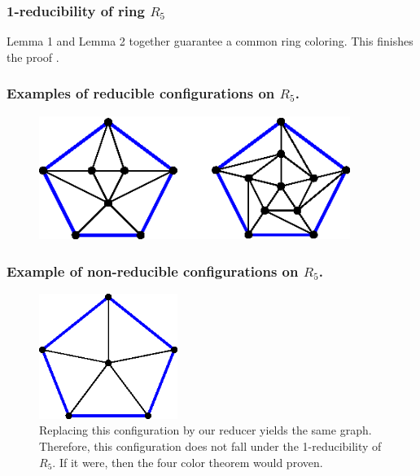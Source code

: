 \begin{frame}
    \frametitle{1-reducibility of ring $R_5$}

    Lemma 1 and Lemma 2 together guarantee a common ring coloring. This finishes the proof \qedsymbol.
\end{frame}

\begin{frame}
    \frametitle{Examples of reducible configurations on $R_5$.}
    \begin{figure}
        \centering
        \includegraphics[width=0.9\textwidth]{images/example5.eps}
    \end{figure}
\end{frame}

\begin{frame}
    \frametitle{Example of non-reducible configurations on $R_5$.}
    \begin{figure}
        \centering
        \includegraphics[width=0.4\textwidth]{images/example5_bad.eps}
        \caption{Replacing this configuration by our reducer yields the same graph. Therefore, this configuration does not fall under the 1-reducibility of $R_5$. If it were, then the four color theorem would proven. }
    \end{figure}
\end{frame}